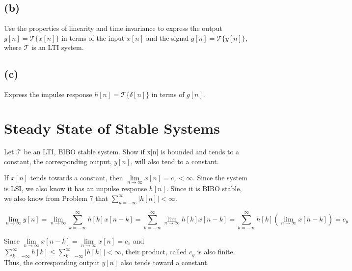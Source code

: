 \documentclass[11pt]{article}
\begin{document}
\subsection*{(b)} 
Use the properties of linearity and time invariance to express the output $y[n] = \mathcal{T}\{x[n]\}$ in terms of the input $x[n]$ and the signal $g[n]=\mathcal{T}\{y[n]\}$, where $\mathcal{T}$ is an LTI system.

\subsection*{(c)} 
Express the impulse response $h[n]=\mathcal{T}\{\delta[n]\}$ in terms of $g[n]$.

\section{Steady State of Stable Systems}
Let $\mathcal{T}$ be an LTI, BIBO stable system. Show if x[n] is bounded and tends to a constant, the corresponding output, $y[n]$, will also tend to a constant.

{\color{blue}
If $x[n]$ tends towards a constant, then $\lim\limits_{n\rightarrow \infty} x[n] = c_x < \infty$. Since the system is LSI, we also know it has an impulse response $h[n]$. Since it is BIBO stable, we also know from Problem 7 that $\sum\limits_{n=-\infty}^\infty \big| h[n]\big| < \infty$.

\[
\lim\limits_{n\rightarrow \infty} y[n] = \lim\limits_{n\rightarrow \infty} \sum\limits_{k=-\infty}^\infty h[k]x[n-k] = \sum\limits_{k=-\infty}^\infty  \lim\limits_{n\rightarrow \infty} h[k]x[n-k] = \sum\limits_{k=-\infty}^\infty h[k] \left( \lim\limits_{n\rightarrow \infty} x[n-k] \right) =c_y
\]

Since $\lim\limits_{n\rightarrow \infty} x[n-k] = \lim\limits_{n\rightarrow \infty} x[n] = c_x$ and $\sum\limits_{k=-\infty}^\infty h[k] \leq \sum\limits_{k=-\infty}^\infty |h[k]| < \infty$, their product, called $c_y$ is also finite. Thus, the corresponding output $y[n]$ also tends toward a constant.
}
\end{document}
